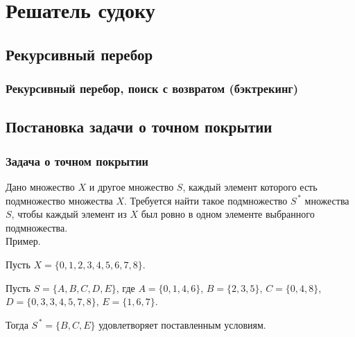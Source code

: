 \documentclass{beamer}
\begin{document}
\section{Решатель судоку}

\subsection{Рекурсивный перебор}
\begin{frame}
\frametitle{Рекурсивный перебор, поиск с возвратом (бэктрекинг)}

\end{frame}




\subsection{Постановка задачи о точном покрытии}
\begin{frame}

\frametitle{Задача о точном покрытии}

Дано множество $X$ и другое множество $S$, каждый элемент которого есть подмножество множества $X$. Требуется найти такое подмножество $S^{\,*}$ множества $S$, чтобы каждый элемент из $X$ был ровно в одном элементе выбранного подмножества.\\

Пример.

Пусть $X=\{0,1,2,3,4,5,6,7,8\}$.

Пусть $S=\{A,B,C,D,E\}$, где $A=\{0,1,4,6\}$, $B=\{2,3,5\}$, $C=\{0,4,8\}$, $D=\{0,3,3,4,5,7,8\}$, $E=\{1,6,7\}$.

Тогда $S^{\,*}=\{B,C,E\}$ удовлетворяет поставленным условиям.


\end{frame}
\end{document}
